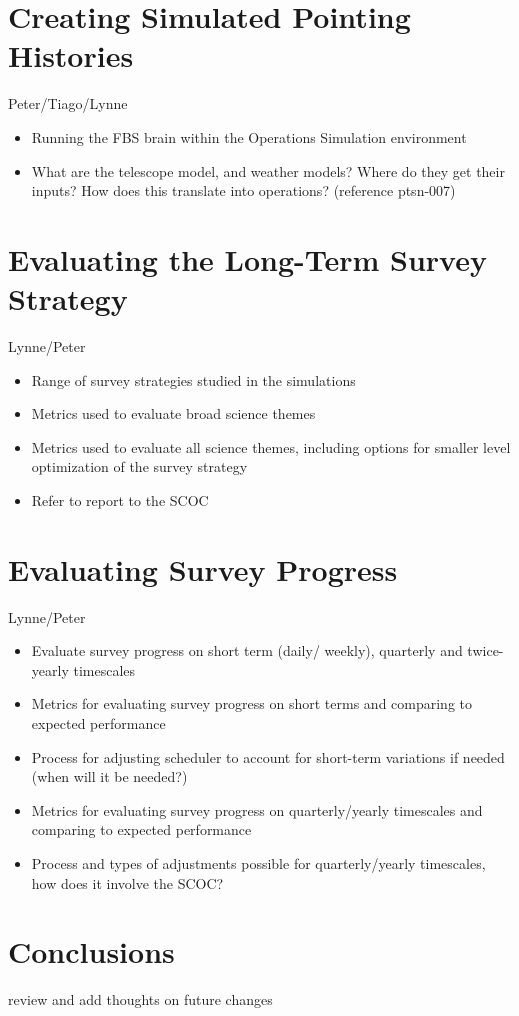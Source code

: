\section{Creating Simulated Pointing Histories}
Peter/Tiago/Lynne

\begin{itemize}
\item Running the FBS brain within the Operations Simulation environment
\item What are the telescope model, and weather models? Where do they get their inputs? How does this translate into operations? (reference ptsn-007)
\end{itemize}

\section{Evaluating the Long-Term Survey Strategy}
Lynne/Peter

\begin{itemize}
\item Range of survey strategies studied in the simulations 
\item Metrics used to evaluate broad science themes 
\item Metrics used to evaluate all science themes, including options for smaller level optimization of the survey strategy
\item Refer to report to the SCOC
\end{itemize}

\section{Evaluating Survey Progress}
Lynne/Peter

\begin{itemize}
\item Evaluate survey progress on short term (daily/ weekly), quarterly and twice-yearly timescales
\item Metrics for evaluating survey progress on short terms and comparing to expected performance
\item Process for adjusting scheduler to account for short-term variations if needed (when will it be needed?)
\item Metrics for evaluating survey progress on quarterly/yearly timescales and comparing to expected performance
\item Process and types of adjustments possible for quarterly/yearly timescales, how does it involve the SCOC?
\end{itemize}

\section{Conclusions}

review and add thoughts on future changes

